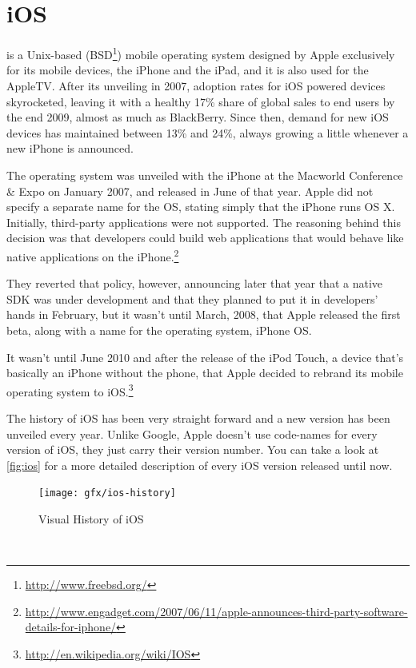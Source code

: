 \section{iOS}
 is a Unix-based (BSD\footnote{\url{http://www.freebsd.org/}}) mobile operating system designed by Apple exclusively for its mobile devices, the iPhone and the iPad, and it is also used for the AppleTV. After its unveiling in 2007, adoption rates for iOS powered devices skyrocketed, leaving it with a healthy 17\% share of global sales to end users by the end 2009, almost as much as BlackBerry. Since then, demand for new iOS devices has maintained between 13\% and 24\%, always growing a little whenever a new iPhone is announced.

The operating system was unveiled with the iPhone at the Macworld Conference \& Expo on January 2007, and released in June of that year. Apple did not specify a separate name for the \ac{OS}, stating simply that the iPhone runs OS X. Initially, third-party applications were not supported. The reasoning behind this decision was that developers could build web applications that would behave like native applications on the iPhone.\footnote{\url{http://www.engadget.com/2007/06/11/apple-announces-third-party-software-details-for-iphone/}} 

They reverted that policy, however, announcing later that year that a native \ac{SDK} was under development and that they planned to put it in developers' hands in February, but it wasn't until March, 2008, that Apple released the first beta, along with a name for the operating system, iPhone \ac{OS}.

It wasn't until June 2010 and after the release of the iPod Touch, a device that's basically an iPhone without the phone, that Apple decided to rebrand its mobile operating system to iOS.\footnote{\url{http://en.wikipedia.org/wiki/IOS}}

The history of iOS has been very straight forward and a new version has been unveiled every year. Unlike Google, Apple doesn't use code-names for every version of iOS, they just carry their version number. You can take a look at \autoref{fig:ios} for a more detailed description of every iOS version released until now.  

\begin{figure}[H]
    \begin{center}
        {\texttt{[image: gfx/ios-history]}}
        \caption[Visual History of iOS]{Visual History of iOS\footnotemark}\label{fig:ios}
    \end{center}
\end{figure}
\\

